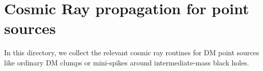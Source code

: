 \section{Cosmic Ray propagation for point sources}

In this directory, we collect the relevant cosmic ray routines for DM point sources
like ordinary DM clumps or mini-spikes around intermediate-mass black holes. 
